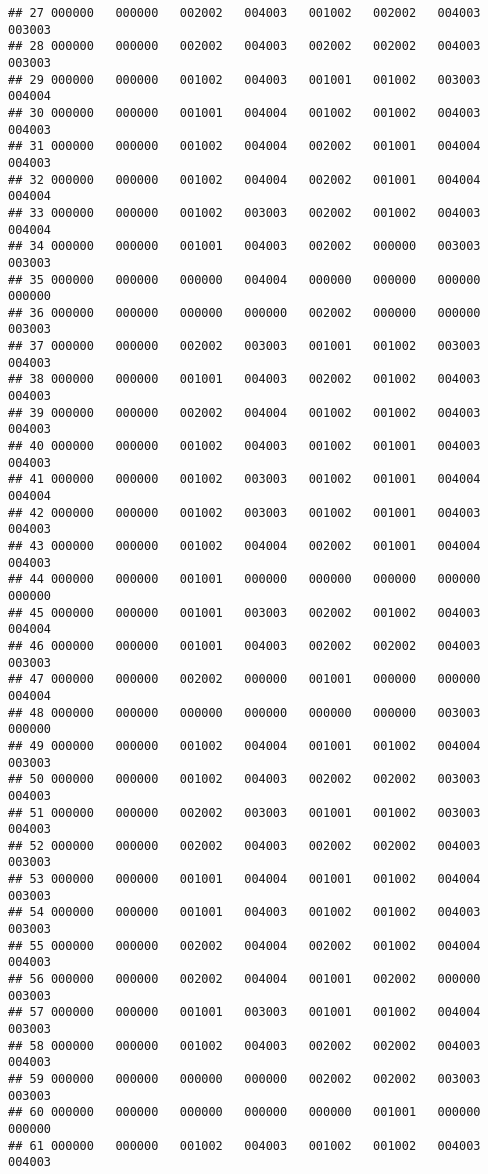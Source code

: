 \documentclass[
]{article}
\begin{document}
\begin{verbatim}
## 27 000000   000000   002002   004003   001002   002002   004003  003003
## 28 000000   000000   002002   004003   002002   002002   004003  003003
## 29 000000   000000   001002   004003   001001   001002   003003  004004
## 30 000000   000000   001001   004004   001002   001002   004003  004003
## 31 000000   000000   001002   004004   002002   001001   004004  004003
## 32 000000   000000   001002   004004   002002   001001   004004  004004
## 33 000000   000000   001002   003003   002002   001002   004003  004004
## 34 000000   000000   001001   004003   002002   000000   003003  003003
## 35 000000   000000   000000   004004   000000   000000   000000  000000
## 36 000000   000000   000000   000000   002002   000000   000000  003003
## 37 000000   000000   002002   003003   001001   001002   003003  004003
## 38 000000   000000   001001   004003   002002   001002   004003  004003
## 39 000000   000000   002002   004004   001002   001002   004003  004003
## 40 000000   000000   001002   004003   001002   001001   004003  004003
## 41 000000   000000   001002   003003   001002   001001   004004  004004
## 42 000000   000000   001002   003003   001002   001001   004003  004003
## 43 000000   000000   001002   004004   002002   001001   004004  004003
## 44 000000   000000   001001   000000   000000   000000   000000  000000
## 45 000000   000000   001001   003003   002002   001002   004003  004004
## 46 000000   000000   001001   004003   002002   002002   004003  003003
## 47 000000   000000   002002   000000   001001   000000   000000  004004
## 48 000000   000000   000000   000000   000000   000000   003003  000000
## 49 000000   000000   001002   004004   001001   001002   004004  003003
## 50 000000   000000   001002   004003   002002   002002   003003  004003
## 51 000000   000000   002002   003003   001001   001002   003003  004003
## 52 000000   000000   002002   004003   002002   002002   004003  003003
## 53 000000   000000   001001   004004   001001   001002   004004  003003
## 54 000000   000000   001001   004003   001002   001002   004003  003003
## 55 000000   000000   002002   004004   002002   001002   004004  004003
## 56 000000   000000   002002   004004   001001   002002   000000  003003
## 57 000000   000000   001001   003003   001001   001002   004004  003003
## 58 000000   000000   001002   004003   002002   002002   004003  004003
## 59 000000   000000   000000   000000   002002   002002   003003  003003
## 60 000000   000000   000000   000000   000000   001001   000000  000000
## 61 000000   000000   001002   004003   001002   001002   004003  004003

\end{verbatim}
\end{document}
